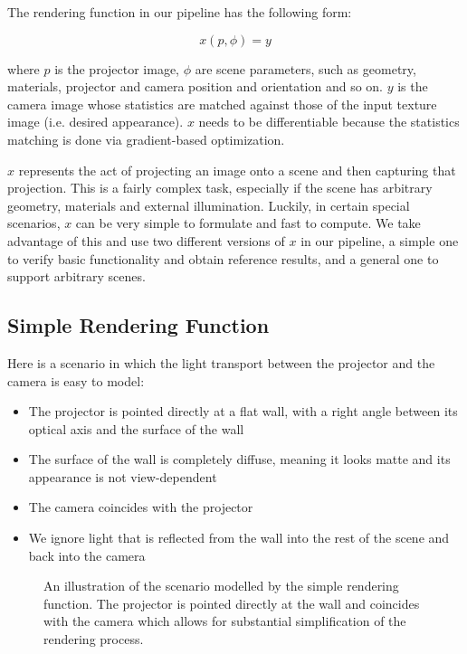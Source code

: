 The rendering function in our pipeline has the following form:

\begin{equation}
    \label{eq:rendering_function}
    x(p, \phi) = y  
\end{equation}

where \(p\) is the projector image, \(\phi\) are scene parameters, such as geometry, materials, projector and camera position and orientation and so on. \(y\) is the camera image whose statistics are matched against those of the input texture image (i.e. desired appearance). \(x\) needs to be differentiable because the statistics matching is done via gradient-based optimization.

\(x\) represents the act of projecting an image onto a scene and then capturing that projection. This is a fairly complex task, especially if the scene has arbitrary geometry, materials and external illumination. Luckily, in certain special scenarios, \(x\) can be very simple to formulate and fast to compute. We take advantage of this and use two different versions of \(x\) in our pipeline, a simple one to verify basic functionality and obtain reference results, and a general one to support arbitrary scenes.

\subsection{Simple Rendering Function}
\label{section:methods-rendering_function-simple}

Here is a scenario in which the light transport between the projector and the camera is easy to model:

\begin{itemize}
    \item The projector is pointed directly at a flat wall, with a right angle between its optical axis and the surface of the wall
    \item The surface of the wall is completely diffuse, meaning it looks matte and its appearance is not view-dependent
    \item The camera coincides with the projector
    \item We ignore light that is reflected from the wall into the rest of the scene and back into the camera
\end{itemize}

\begin{figure}[]
    \centering
    \def\svgwidth{0.6\textwidth}
    
    \caption{An illustration of the scenario modelled by the simple rendering function. The projector is pointed directly at the wall and coincides with the camera which allows for substantial simplification of the rendering process.}
    \label{fig:methods_simple_scenario}
\end{figure}


